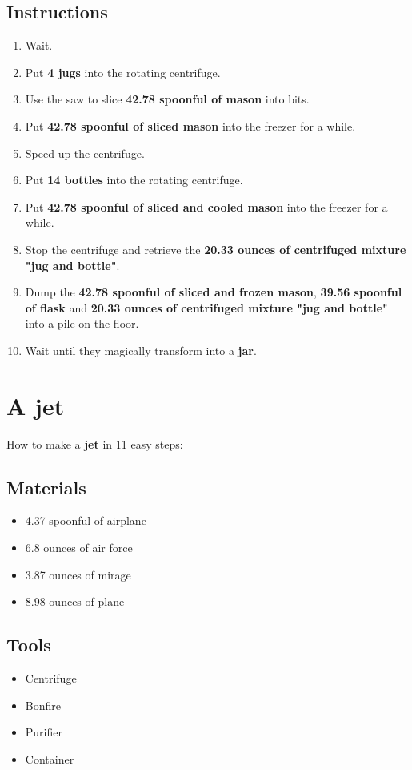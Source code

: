 \documentclass{article}
\begin{document}
\subsection{Instructions}\begin{enumerate}
\item 
Wait.
\item 
Put \textbf{4 jugs} into the rotating centrifuge.
\item 
Use the saw to slice \textbf{42.78 spoonful of mason} into bits.
\item 
Put \textbf{42.78 spoonful of sliced mason} into the freezer for a while.
\item 
Speed up the centrifuge.
\item 
Put \textbf{14 bottles} into the rotating centrifuge.
\item 
Put \textbf{42.78 spoonful of sliced and cooled mason} into the freezer for a while.
\item 
Stop the centrifuge and retrieve the \textbf{20.33 ounces of centrifuged mixture "jug and bottle"}.
\item 
Dump the \textbf{42.78 spoonful of sliced and frozen mason}, \textbf{39.56 spoonful of flask} and \textbf{20.33 ounces of centrifuged mixture "jug and bottle"} into a pile on the floor.
\item 
Wait until they magically transform into a \textbf{jar}.
\end{enumerate}
\newpage
\section{A jet}How to make a \textbf{jet} in 11 easy steps:

\subsection{Materials}\begin{itemize}
\item 
4.37 spoonful of airplane
\item 
6.8 ounces of air force
\item 
3.87 ounces of mirage
\item 
8.98 ounces of plane
\end{itemize}
\subsection{Tools}\begin{itemize}
\item 
Centrifuge
\item 
Bonfire
\item 
Purifier
\item 
Container
\end{itemize}
\end{document}
